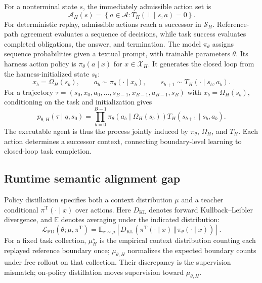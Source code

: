 \documentclass{article}
\begin{document}
For a nonterminal state $s$, the immediately admissible action set is
\begin{equation}
\mathcal A_H(s)=
\left\{a\in\mathcal A:T_H(\bot\mid s,a)=0\right\}.
\label{eq:admissible-actions}
\end{equation}
For deterministic replay, admissible actions reach a successor in
$\mathcal S_H$. Reference-path agreement evaluates a sequence of decisions,
while task success evaluates completed obligations, the answer, and termination.
The model $\pi_\theta$ assigns sequence probabilities given a textual prompt,
with trainable parameters $\theta$. Its harness action policy is
$\pi_\theta(a\mid x)$ for $x\in\mathcal X_H$. It generates
the closed loop from the harness-initialized state $s_0$:
\begin{equation}
x_b=\Omega_H(s_b),\qquad
a_b\sim\pi_\theta(\cdot\mid x_b),\qquad
s_{b+1}\sim T_H(\cdot\mid s_b,a_b).
\label{eq:closed-loop-step}
\end{equation}
For a trajectory $\tau=(s_0,x_0,a_0,\ldots,s_{B-1},x_{B-1},a_{B-1},s_B)$
with $x_b=\Omega_H(s_b)$, conditioning on the task and initialization gives
\begin{equation}
p_{\theta,H}(\tau\mid q,s_0)=\prod_{b=0}^{B-1}
\pi_\theta(a_b\mid\Omega_H(s_b))
T_H(s_{b+1}\mid s_b,a_b).
\label{eq:rollout-distribution}
\end{equation}
The executable agent is thus the process jointly induced by $\pi_\theta$,
$\Omega_H$, and $T_H$. Each action determines a successor context, connecting
boundary-level learning to closed-loop task completion.

\subsection{Runtime semantic alignment gap}
\label{sec:pd-axes}

Policy distillation specifies both a context distribution $\mu$ and a teacher
conditional $\pi^{\mathrm T}(\cdot\mid x)$ over actions. Here
$D_{\mathrm{KL}}$ denotes forward Kullback--Leibler divergence, and
$\mathbb E$ denotes averaging under the indicated distribution:
\begin{equation}
\mathcal L_{\mathrm{PD}}(\theta;\mu,\pi^{\mathrm T})
=\mathbb E_{x\sim\mu}
\left[D_{\mathrm{KL}}\!\left(
\pi^{\mathrm T}(\cdot\mid x)\,\Vert\,
\pi_\theta(\cdot\mid x)\right)\right].
\label{eq:generic-pd}
\end{equation}
For a fixed task collection, $\mu_H^\star$ is the empirical context
distribution counting each replayed reference boundary once;
$\mu_{\theta,H}$ normalizes the expected boundary counts under free rollout
on that collection.
Their discrepancy is the supervision mismatch; on-policy distillation moves
supervision toward $\mu_{\theta,H}$.
\end{document}

